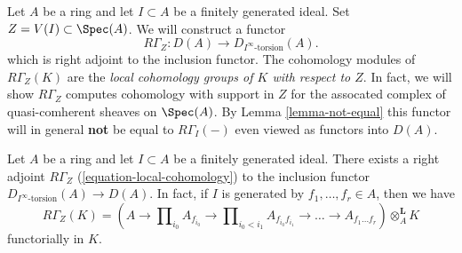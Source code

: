 \noindent
Let $A$ be a ring and let $I \subset A$ be a finitely generated ideal.
Set $Z = V(I) \subset \Spec(A)$. We will construct a functor
\begin{equation}
\label{equation-local-cohomology}
R\Gamma_Z : D(A) \longrightarrow D_{I^\infty\text{-torsion}}(A).
\end{equation}
which is right adjoint to the inclusion functor. The cohomology
modules of $R\Gamma_Z(K)$ are the {\it local cohomology groups
of $K$ with respect to $Z$}. In fact, we will show $R\Gamma_Z$
computes cohomology with support in $Z$ for the assocated
complex of quasi-comherent sheaves on $\Spec(A)$. By
Lemma \ref{lemma-not-equal} this functor will in general {\bf not} be
equal to $R\Gamma_I( - )$ even viewed as functors into $D(A)$.

\begin{lemma}
\label{lemma-local-cohomology-adjoint}
Let $A$ be a ring and let $I \subset A$ be a finitely generated ideal.
There exists a right adjoint $R\Gamma_Z$ (\ref{equation-local-cohomology})
to the inclusion functor $D_{I^\infty\text{-torsion}}(A) \to D(A)$.
In fact, if $I$ is generated by $f_1, \ldots, f_r \in A$, then we have
$$
R\Gamma_Z(K) =
(A \to \prod\nolimits_{i_0} A_{f_{i_0}} \to
\prod\nolimits_{i_0 < i_1} A_{f_{i_0}f_{i_1}}
\to \ldots \to A_{f_1\ldots f_r}) \otimes_A^\mathbf{L} K
$$
functorially in $K$.
\end{lemma}

